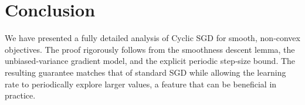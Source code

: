 \documentclass[11pt]{article}
\begin{document}
\section*{Conclusion}
We have presented a fully detailed analysis of Cyclic SGD for smooth,
non‑convex objectives.  The proof rigorously follows from the smoothness
descent lemma, the unbiased‑variance gradient model, and the explicit
periodic step‑size bound.  The resulting guarantee matches that of standard
SGD while allowing the learning rate to periodically explore larger values,
a feature that can be beneficial in practice.
\end{document}
